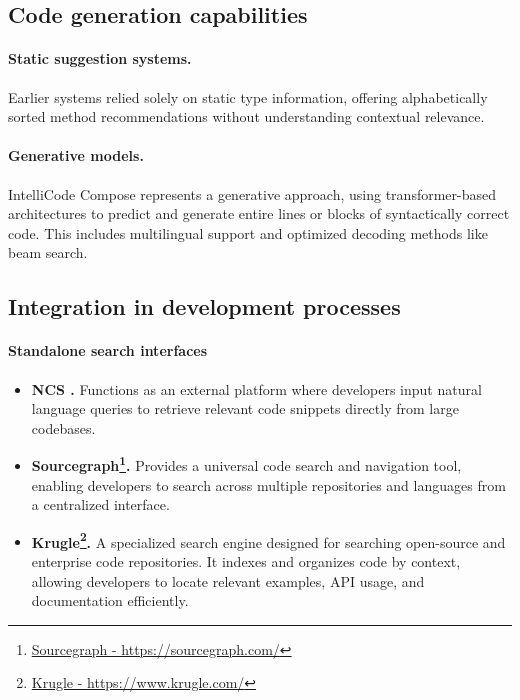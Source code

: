 \subsection{Code generation capabilities}
\paragraph*{Static suggestion systems.} Earlier systems \cite{bruch2009} relied solely on static type information, offering alphabetically sorted method recommendations without understanding contextual relevance.

\paragraph*{Generative models.} IntelliCode Compose represents a generative approach, using transformer-based architectures \cite{vaswani2017} to predict and generate entire lines or blocks of syntactically correct code. This includes multilingual support and optimized decoding methods like beam search.

\subsection{Integration in development processes}
\paragraph*{Standalone search interfaces}
    \begin{itemize}
        \item \textbf{NCS \cite{sachdev2018}.} Functions as an external platform where developers input natural language queries to retrieve relevant code snippets directly from large codebases.
        \item \textbf{Sourcegraph\footnote{\href{https://sourcegraph.com/}{Sourcegraph - https://sourcegraph.com/}}.} Provides a universal code search and navigation tool, enabling developers to search across multiple repositories and languages from a centralized interface.
        \item \textbf{Krugle\footnote{\href{https://www.krugle.com/}{Krugle - https://www.krugle.com/}}.} A specialized search engine designed for searching open-source and enterprise code repositories. It indexes and organizes code by context, allowing developers to locate relevant examples, API usage, and documentation efficiently.
    \end{itemize}

